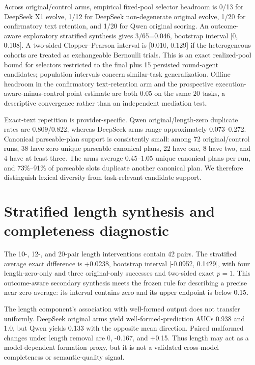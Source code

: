 Across original/control arms, empirical fixed-pool selector headroom is 0/13 for DeepSeek X1 evolve, 1/12 for DeepSeek non-degenerate original evolve, 1/20 for confirmatory text retention, and 1/20 for Qwen original scoring. An outcome-aware exploratory stratified synthesis gives 3/65=0.046, bootstrap interval [0, 0.108]. A two-sided Clopper--Pearson interval is [0.010, 0.129] if the heterogeneous cohorts are treated as exchangeable Bernoulli trials. This is an exact realized-pool bound for selectors restricted to the final plus 15 persisted round-agent candidates; population intervals concern similar-task generalization. Offline headroom in the confirmatory text-retention arm and the prospective execution-aware-minus-control point estimate are both 0.05 on the same 20 tasks, a descriptive convergence rather than an independent mediation test.

Exact-text repetition is provider-specific. Qwen original/length-zero duplicate rates are 0.809/0.822, whereas DeepSeek arms range approximately 0.073--0.272. Canonical parseable-plan support is consistently small: among 72 original/control runs, 38 have zero unique parseable canonical plans, 22 have one, 8 have two, and 4 have at least three. The arms average 0.45--1.05 unique canonical plans per run, and 73\%--91\% of parseable slots duplicate another canonical plan. We therefore distinguish lexical diversity from task-relevant candidate support.

\section{Stratified length synthesis and completeness diagnostic}

The 10-, 12-, and 20-pair length interventions contain 42 pairs. The stratified average exact difference is +0.0238, bootstrap interval [-0.0952, 0.1429], with four length-zero-only and three original-only successes and two-sided exact \(p=1\). This outcome-aware secondary synthesis meets the frozen rule for describing a precise near-zero average: its interval contains zero and its upper endpoint is below 0.15.

The length component's association with well-formed output does not transfer uniformly. DeepSeek original arms yield well-formed-prediction AUCs 0.938 and 1.0, but Qwen yields 0.133 with the opposite mean direction. Paired malformed changes under length removal are 0, -0.167, and +0.15. Thus length may act as a model-dependent formation proxy, but it is not a validated cross-model completeness or semantic-quality signal.

